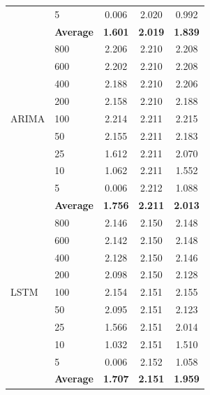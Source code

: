 \documentclass[11pt,a4paper]{article}
\begin{document}
\begin{table}[H]
\begin{tabular}{llccc}
 & 5   & 0.006 & 2.020 & 0.992 \\
 & \textbf{Average} & \textbf{1.601} & \textbf{2.019} & \textbf{1.839} \\
\midrule
\multirow{9}{*}{ARIMA}
 & 800 & 2.206 & 2.210 & 2.208 \\
 & 600 & 2.202 & 2.210 & 2.208 \\
 & 400 & 2.188 & 2.210 & 2.206 \\
 & 200 & 2.158 & 2.210 & 2.188 \\
 & 100 & 2.214 & 2.211 & 2.215 \\
 & 50  & 2.155 & 2.211 & 2.183 \\
 & 25  & 1.612 & 2.211 & 2.070 \\
 & 10  & 1.062 & 2.211 & 1.552 \\
 & 5   & 0.006 & 2.212 & 1.088 \\
 & \textbf{Average} & \textbf{1.756} & \textbf{2.211} & \textbf{2.013} \\
\midrule
\multirow{9}{*}{LSTM}
 & 800 & 2.146 & 2.150 & 2.148 \\
 & 600 & 2.142 & 2.150 & 2.148 \\
 & 400 & 2.128 & 2.150 & 2.146 \\
 & 200 & 2.098 & 2.150 & 2.128 \\
 & 100 & 2.154 & 2.151 & 2.155 \\
 & 50  & 2.095 & 2.151 & 2.123 \\
 & 25  & 1.566 & 2.151 & 2.014 \\
 & 10  & 1.032 & 2.151 & 1.510 \\
 & 5   & 0.006 & 2.152 & 1.058 \\
 & \textbf{Average} & \textbf{1.707} & \textbf{2.151} & \textbf{1.959} \\
\bottomrule
\end{tabular}
\end{table}
\end{document}
